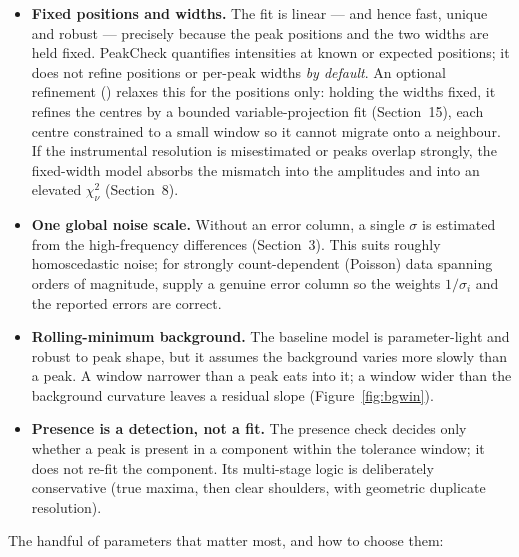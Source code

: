 \documentclass[11pt,a4paper]{article}
\begin{document}
\begin{itemize}
\item \textbf{Fixed positions and widths.} The fit is linear --- and hence fast,
unique and robust --- precisely because the peak positions and the two widths are
held fixed. PeakCheck quantifies intensities at known or expected positions; it
does not refine positions or per-peak widths \emph{by default}. An optional
refinement () relaxes this for the positions only: holding
the widths fixed, it refines the centres by a bounded variable-projection fit
(Section~15), each centre constrained to a small window so it cannot migrate
onto a neighbour. If the instrumental resolution is
misestimated or peaks overlap strongly, the fixed-width model absorbs the
mismatch into the amplitudes and into an elevated $\chi^2_\nu$ (Section~8).
\item \textbf{One global noise scale.} Without an error column, a single $\sigma$
is estimated from the high-frequency differences (Section~3). This suits roughly
homoscedastic noise; for strongly count-dependent (Poisson) data spanning orders
of magnitude, supply a genuine error column so the weights $1/\sigma_i$ and the
reported errors are correct.
\item \textbf{Rolling-minimum background.} The baseline model is parameter-light
and robust to peak shape, but it assumes the background varies more slowly than a
peak. A window narrower than a peak eats into it; a window wider than the
background curvature leaves a residual slope (Figure~\ref{fig:bgwin}).
\item \textbf{Presence is a detection, not a fit.} The presence check decides only
whether a peak is present in a component within the tolerance window; it does not
re-fit the component. Its multi-stage logic is deliberately conservative (true
maxima, then clear shoulders, with geometric duplicate resolution).
\end{itemize}

\noindent The handful of parameters that matter most, and how to choose them:
\end{document}
